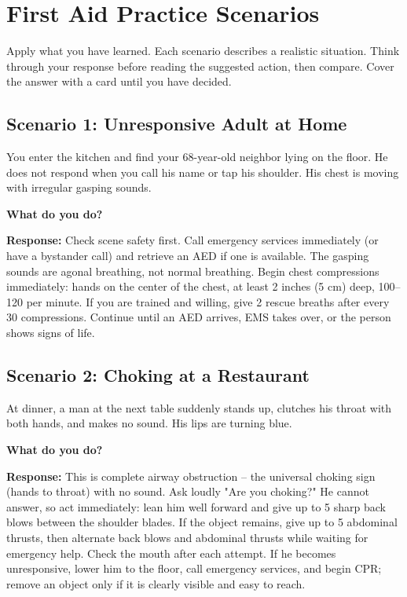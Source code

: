 \chapter{First Aid Practice Scenarios}\label{ch:scenarios}

Apply what you have learned. Each scenario describes a realistic situation. Think through your response before reading the suggested action, then compare. Cover the answer with a card until you have decided.

\section{Scenario 1: Unresponsive Adult at Home}

You enter the kitchen and find your 68-year-old neighbor lying on the floor. He does not respond when you call his name or tap his shoulder. His chest is moving with irregular gasping sounds.

\textbf{What do you do?}

\textbf{Response:} Check scene safety first. Call emergency services immediately (or have a bystander call) and retrieve an AED if one is available. The gasping sounds are agonal breathing, not normal breathing. Begin chest compressions immediately: hands on the center of the chest, at least 2 inches (5 cm) deep, 100--120 per minute. If you are trained and willing, give 2 rescue breaths after every 30 compressions. Continue until an AED arrives, EMS takes over, or the person shows signs of life.

\section{Scenario 2: Choking at a Restaurant}

At dinner, a man at the next table suddenly stands up, clutches his throat with both hands, and makes no sound. His lips are turning blue.

\textbf{What do you do?}

\textbf{Response:} This is complete airway obstruction -- the universal choking sign (hands to throat) with no sound. Ask loudly "Are you choking?" He cannot answer, so act immediately: lean him well forward and give up to 5 sharp back blows between the shoulder blades. If the object remains, give up to 5 abdominal thrusts, then alternate back blows and abdominal thrusts while waiting for emergency help. Check the mouth after each attempt. If he becomes unresponsive, lower him to the floor, call emergency services, and begin CPR; remove an object only if it is clearly visible and easy to reach.

